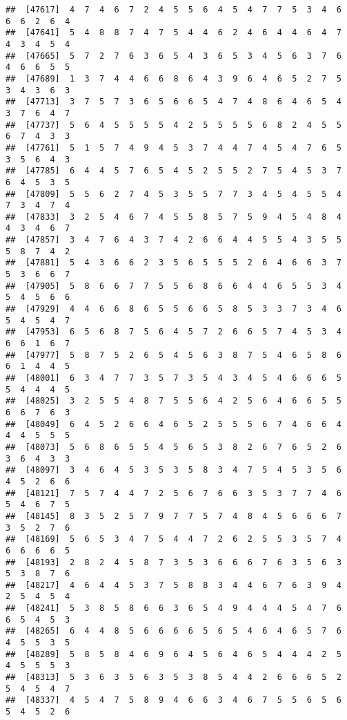 \documentclass[
]{book}
\begin{document}
\begin{verbatim}
##  [47617]  4  7  4  6  7  2  4  5  5  6  4  5  4  7  7  5  3  4  6  6  6  2  6  4
##  [47641]  5  4  8  8  7  4  7  5  4  4  6  2  4  6  4  4  6  4  7  4  3  4  5  4
##  [47665]  5  7  2  7  6  3  6  5  4  3  6  5  3  4  5  6  3  7  6  4  6  6  5  5
##  [47689]  1  3  7  4  4  6  6  8  6  4  3  9  6  4  6  5  2  7  5  3  4  3  6  3
##  [47713]  3  7  5  7  3  6  5  6  6  5  4  7  4  8  6  4  6  5  4  3  7  6  4  7
##  [47737]  5  6  4  5  5  5  5  4  2  5  5  5  5  6  8  2  4  5  5  6  7  4  3  3
##  [47761]  5  1  5  7  4  9  4  5  3  7  4  4  7  4  5  4  7  6  5  3  5  6  4  3
##  [47785]  6  4  4  5  7  6  5  4  5  2  5  5  2  7  5  4  5  3  7  6  4  5  3  5
##  [47809]  5  5  6  2  7  4  5  3  5  5  7  7  3  4  5  4  5  5  4  7  3  4  7  4
##  [47833]  3  2  5  4  6  7  4  5  5  8  5  7  5  9  4  5  4  8  4  4  3  4  6  7
##  [47857]  3  4  7  6  4  3  7  4  2  6  6  4  4  5  5  4  3  5  5  5  8  7  4  2
##  [47881]  5  4  3  6  6  2  3  5  6  5  5  5  2  6  4  6  6  3  7  5  3  6  6  7
##  [47905]  5  8  6  6  7  7  5  5  6  8  6  6  4  4  6  5  5  3  4  5  4  5  6  6
##  [47929]  4  4  6  6  8  6  5  5  6  6  5  8  5  3  3  7  3  4  6  5  4  5  4  7
##  [47953]  6  5  6  8  7  5  6  4  5  7  2  6  6  5  7  4  5  3  4  6  6  1  6  7
##  [47977]  5  8  7  5  2  6  5  4  5  6  3  8  7  5  4  6  5  8  6  6  1  4  4  5
##  [48001]  6  3  4  7  7  3  5  7  3  5  4  3  4  5  4  6  6  6  5  5  4  4  4  5
##  [48025]  3  2  5  5  4  8  7  5  5  6  4  2  5  6  4  6  6  5  5  6  6  7  6  3
##  [48049]  6  4  5  2  6  6  4  6  5  2  5  5  5  6  7  4  6  6  4  4  4  5  5  5
##  [48073]  5  6  8  6  5  5  4  5  6  5  3  8  2  6  7  6  5  2  6  3  6  4  3  3
##  [48097]  3  4  6  4  5  3  5  3  5  8  3  4  7  5  4  5  3  5  6  4  5  2  6  6
##  [48121]  7  5  7  4  4  7  2  5  6  7  6  6  3  5  3  7  7  4  6  5  4  6  7  5
##  [48145]  8  3  5  2  5  7  9  7  7  5  7  4  8  4  5  6  6  6  7  3  5  2  7  6
##  [48169]  5  6  5  3  4  7  5  4  4  7  2  6  2  5  5  3  5  7  4  6  6  6  6  5
##  [48193]  2  8  2  4  5  8  7  3  5  3  6  6  6  7  6  3  5  6  3  5  3  8  7  6
##  [48217]  4  6  4  4  5  3  7  5  8  8  3  4  4  6  7  6  3  9  4  2  5  4  5  4
##  [48241]  5  3  8  5  8  6  6  3  6  5  4  9  4  4  4  5  4  7  6  6  5  4  5  3
##  [48265]  6  4  4  8  5  6  6  6  6  5  6  5  4  6  4  6  5  7  6  4  5  5  3  5
##  [48289]  5  8  5  8  4  6  9  6  4  5  6  4  6  5  4  4  4  2  5  4  5  5  5  3
##  [48313]  5  3  6  3  5  6  3  5  3  8  5  4  4  2  6  6  6  5  2  5  4  5  4  7
##  [48337]  4  5  4  7  5  8  9  4  6  6  3  4  6  7  5  5  6  5  6  5  4  5  2  6

\end{verbatim}
\end{document}

